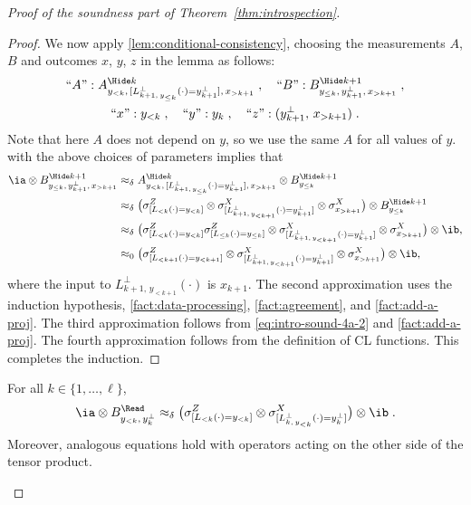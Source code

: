 \begin{proof}[Proof of the soundness part of Theorem~\ref{thm:introspection}]
\begin{proof}
    We now apply \cref{lem:conditional-consistency}, choosing the measurements
    $A$, $B$ and outcomes $x$, $y$, $z$ in the lemma as follows:
    \begin{gather*}
      \text{``$A$''}: \ahk[{y_{<k},\, [L^\perp_{k+1,\, y_{\le k}}(\cdot) =
          y^\perp_{k+1}],\, x_{>k+1}}]\;, \quad
      \text{``$B$''}: \bhp[y_{\le k},\, y^\perp_{k+1},\, x_{>k+1}]\;, \\
      \text{``$x$''}: y_{<k}\;, \quad
      \text{``$y$''}: y_k\;, \quad
      \text{``$z$''}: (y^\perp_{k+1},\, x_{>k+1})\;.
    \end{gather*}
		Note that here $A$ does not depend on $y$, so we use the same $A$ for all values of $y$. 
     with the above choices of parameters
    implies that
    \begin{equation*}
      \begin{split}
        \ia \otimes \bhp[y_{\le k},\, y^\perp_{k+1},\, x_{>k+1}]
        & \approx_\delta \ahk[{y_{<k},\, [L^\perp_{k+1,\, y_{\le k}}(\cdot) =
          y^\perp_{k+1}],\, x_{>k+1}}] \otimes \bhp[y_{\le k}]\\
        & \approx_\delta  \bigl( \zLlk \otimes \xLperpk[k+1] \otimes \x[x_{>k+1}]
        \bigr) \otimes \bhp[y_{\le k}]\\
        & \approx_\delta \bigl( \zLlk \zLlek \otimes \xLperpk[k+1] \otimes \x[x_{>k+1}]
        \bigr) \otimes \ib,\\
        & \approx_0 \bigl( \zLlk[k+1] \otimes \xLperpk[k+1] \otimes \x[x_{>k+1}]
        \bigr) \otimes \ib,
      \end{split}
    \end{equation*}
    where the input to $L^\perp_{k+1,\, y_{<k+1}}(\cdot)$ is $x_{k+1}$.
    The second approximation uses the induction hypothesis,
    \cref{fact:data-processing}, \cref{fact:agreement}, and
    \cref{fact:add-a-proj}.
    The third approximation follows from \cref{eq:intro-sound-4a-2} and
    \cref{fact:add-a-proj}.
    The fourth approximation follows from the definition of CL functions.
    This completes the induction.
  \end{proof}

  \begin{lemma}
    For all $k \in \{1, \ldots, \ell\}$,
	  \begin{equation}
      \label{eq:intro-sound-4}
      \ia \otimes \br[y_{<k},\, y_k^\perp] \approx_\delta
      \bigl( \zLlk \otimes \xLperpk \bigr) \otimes \ib \;.
    \end{equation}
    Moreover, analogous equations hold with operators acting on the other side
    of the tensor product.
  \end{lemma}


\end{proof}
